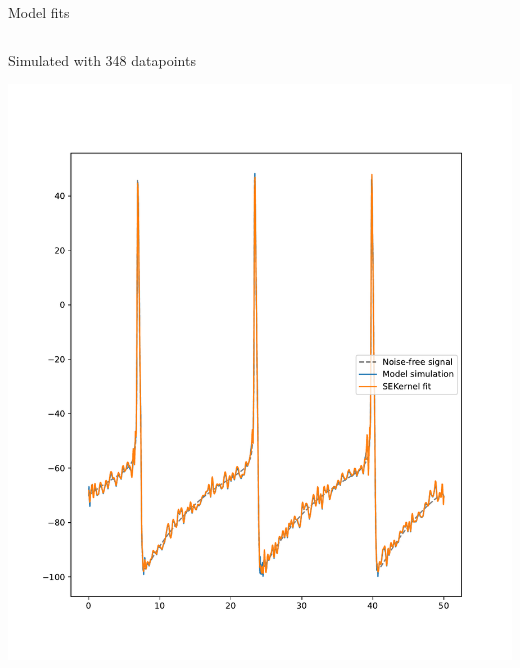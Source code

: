 \documentclass[presentation]{beamer}
\begin{document}
\begin{frame}[plain,label={sec:org8a1d207}]{Model fits}
\begin{columns}
\begin{column}{0.5\columnwidth}
\begin{center}
Simulated with 348 datapoints
\end{center}
\begin{center}
\includegraphics[width=1.1\textwidth]{./nodownsample.pdf}
\end{center}
\end{column}
\end{columns}
\end{frame}
\end{document}
